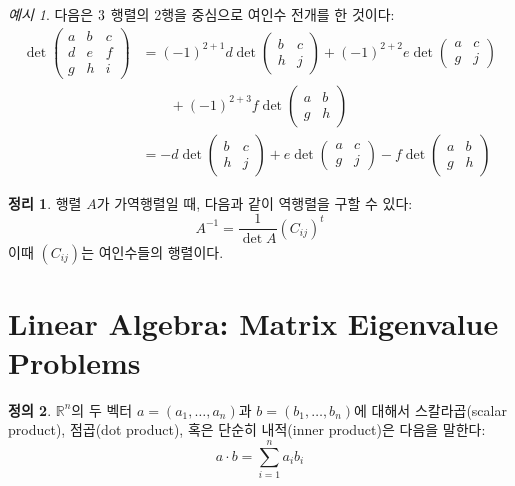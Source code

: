 \documentclass[unfonts,oneside,a4paper]{oblivoir}
\theoremstyle{definition}
\newtheorem{definition}{정의}[section]
\theoremstyle{theorem}
\newtheorem{theorem}[definition]{정리}
\theoremstyle{theorem}
\theoremstyle{remark}
\theoremstyle{remark}
\theoremstyle{remark}
\newtheorem*{example}{예시}
\theoremstyle{remark}
\renewcommand{\vec}[1]{\bm{\mathit{#1}}}
\begin{document}
\begin{example}
    다음은 $3 \time 3$ 행렬의 2행을 중심으로 여인수 전개를 한 것이다:
    \begin{align*}
        \det
        \begin{pmatrix}
            a & b & c\\
            d & e & f\\
            g & h & i
        \end{pmatrix}
        &= (-1)^{2 + 1} d \det
        \begin{pmatrix}
            b & c\\
            h & j
        \end{pmatrix}
        + (-1)^{2 + 2} e \det
        \begin{pmatrix}
            a & c\\
            g & j
        \end{pmatrix}\\
        &\qquad+ (-1)^{2 + 3} f \det
        \begin{pmatrix}
            a & b\\
            g & h
        \end{pmatrix}\\
        &= -d \det
        \begin{pmatrix}
            b & c\\
            h & j
        \end{pmatrix}
        + e \det
        \begin{pmatrix}
            a & c\\
            g & j
        \end{pmatrix}
        -f \det
        \begin{pmatrix}
            a & b\\
            g & h
        \end{pmatrix}
    \end{align*}
\end{example}

\begin{theorem}
    행렬 $A$가 가역행렬일 때, 다음과 같이 역행렬을 구할 수 있다:
    \begin{equation*}
        A^{-1} = \frac{1}{\det A} (C_{ij})^t
    \end{equation*}
    이때 $(C_{ij})$는 여인수들의 행렬이다.
\end{theorem}

\section{Linear Algebra: Matrix Eigenvalue Problems}
\begin{definition}
    $\mathbb R^n$의 두 벡터 $\vec a = (a_1, \dots, a_n)$과 $\vec b = (b_1, \dots, b_n)$에 대해서 스칼라곱(scalar product), 점곱(dot product), 혹은 단순히 내적(inner product)은 다음을 말한다:
    \begin{equation*}
        \vec a \cdot \vec b = \sum_{i = 1}^n a_i b_i
    \end{equation*}
\end{definition}
\end{document}
